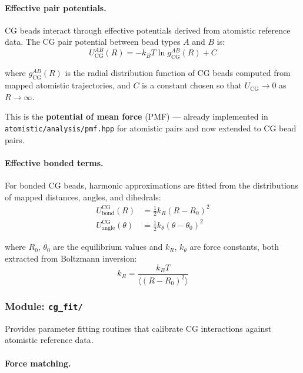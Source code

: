 \documentclass[11pt]{article}
\newcommand{\file}[1]{\texttt{#1}}
\begin{document}
\paragraph{Effective pair potentials.}

CG beads interact through effective potentials derived from atomistic
reference data.  The CG pair potential between bead types $A$ and $B$ is:
\begin{equation}
  U_\text{CG}^{AB}(R) = -k_B T \ln g_\text{CG}^{AB}(R) + C
  \label{eq:cg_pair}
\end{equation}

where $g_\text{CG}^{AB}(R)$ is the radial distribution function of
CG beads computed from mapped atomistic trajectories, and $C$ is a
constant chosen so that $U_\text{CG} \to 0$ as $R \to \infty$.

This is the \textbf{potential of mean force} (PMF) --- already implemented
in \file{atomistic/analysis/pmf.hpp} for atomistic pairs and now extended
to CG bead pairs.

\paragraph{Effective bonded terms.}

For bonded CG beads, harmonic approximations are fitted from the
distributions of mapped distances, angles, and dihedrals:
\begin{align}
  U_\text{bond}^\text{CG}(R) &= \tfrac{1}{2} k_R (R - R_0)^2 \\
  U_\text{angle}^\text{CG}(\theta) &= \tfrac{1}{2} k_\theta (\theta - \theta_0)^2
\end{align}

where $R_0$, $\theta_0$ are the equilibrium values and $k_R$, $k_\theta$
are force constants, both extracted from Boltzmann inversion:
\begin{equation}
  k_R = \frac{k_B T}{\langle (R - R_0)^2 \rangle}
  \label{eq:boltzmann_inversion}
\end{equation}

\subsubsection{Module: \texttt{cg\_fit/}}

Provides parameter fitting routines that calibrate CG interactions against
atomistic reference data.

\paragraph{Force matching.}
\end{document}
